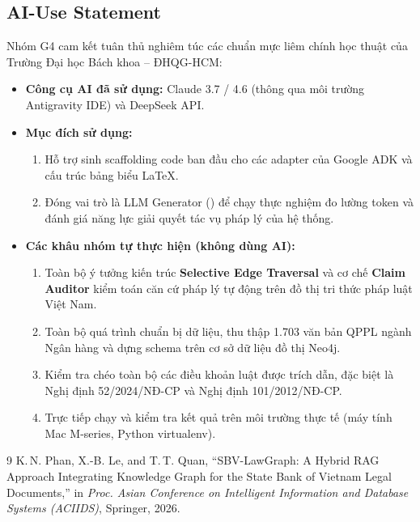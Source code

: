 \documentclass[10pt,a4paper]{article}
\begin{document}
\subsection{AI-Use Statement}
Nhóm G4 cam kết tuân thủ nghiêm túc các chuẩn mực liêm chính học thuật của Trường Đại học Bách khoa -- ĐHQG-HCM:
\begin{itemize}
  \item \textbf{Công cụ AI đã sử dụng:} Claude 3.7 / 4.6 (thông qua môi trường Antigravity IDE) và DeepSeek API.
  \item \textbf{Mục đích sử dụng:}
    \begin{enumerate}
      \item Hỗ trợ sinh scaffolding code ban đầu cho các adapter của Google ADK và cấu trúc bảng biểu LaTeX.
      \item Đóng vai trò là LLM Generator () để chạy thực nghiệm đo lường token và đánh giá năng lực giải quyết tác vụ pháp lý của hệ thống.
    \end{enumerate}
  \item \textbf{Các khâu nhóm tự thực hiện (không dùng AI):}
    \begin{enumerate}
      \item Toàn bộ ý tưởng kiến trúc \textbf{Selective Edge Traversal} và cơ chế \textbf{Claim Auditor} kiểm toán căn cứ pháp lý tự động trên đồ thị tri thức pháp luật Việt Nam.
      \item Toàn bộ quá trình chuẩn bị dữ liệu, thu thập 1.703 văn bản QPPL ngành Ngân hàng và dựng schema trên cơ sở dữ liệu đồ thị Neo4j.
      \item Kiểm tra chéo toàn bộ các điều khoản luật được trích dẫn, đặc biệt là Nghị định 52/2024/NĐ-CP và Nghị định 101/2012/NĐ-CP.
      \item Trực tiếp chạy và kiểm tra kết quả trên môi trường thực tế (máy tính Mac M-series, Python virtualenv).
    \end{enumerate}
\end{itemize}

\renewcommand{\refname}{Tài liệu tham khảo}
\begin{thebibliography}{9}
 K.\,N. Phan, X.-B. Le, and T.\,T. Quan, ``SBV-LawGraph: A Hybrid RAG Approach Integrating Knowledge Graph for the State Bank of Vietnam Legal Documents,'' in \textit{Proc. Asian Conference on Intelligent Information and Database Systems (ACIIDS)}, Springer, 2026.
\end{thebibliography}
\end{document}
